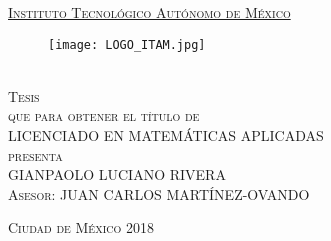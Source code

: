 \documentclass[../Main/Main.tex]{subfiles}
\begin{document}

\begin{titlepage}
\begin{center}

\vspace{3em}
\underline{\textsc{\Large Instituto Tecnológico Autónomo de México}}\\[5em]

\begin{figure}[h]
\begin{center}
\texttt{[image: LOGO\_ITAM.jpg]}
\end{center}
\end{figure}

\vspace{3em}

\textsc{\LARGE \textbf{\tituloMayus}}\\[5em]

\textsc{\large Tesis}\\[2em]

\textsc{que para obtener el título de}\\[2em]

\textsc{LICENCIADO EN MATEMÁTICAS APLICADAS}\\[2em]

\textsc{presenta}\\[2em]

\textsc{\Large GIANPAOLO LUCIANO RIVERA}\\[2em]

\textsc{\large Asesor: JUAN CARLOS MARTÍNEZ-OVANDO}

\end{center}

\vspace*{\fill}
\textsc{Ciudad de México \hspace*{\fill} 2018}

\end{titlepage}
\end{document}
